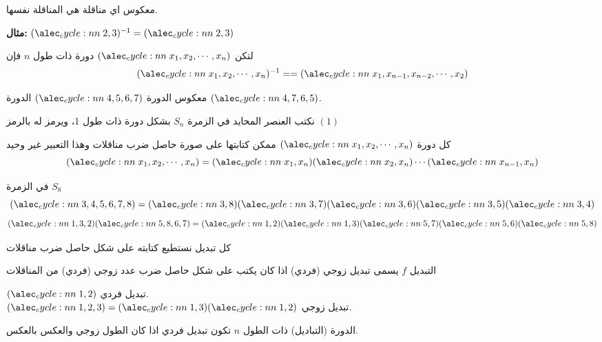 \begin{note}
معكوس اي مناقلة هي المناقلة نفسها.
\end{note}
\noindent
\textbf{مثال: }$\cycle{2,3}^{-1} = \cycle{2,3}$

\begin{note}
	لتكن $\cycle{x_1, x_2, \cdots, x_n}$ دورة ذات طول $n$ فإن
	\[
	\cycle{x_1, x_2, \cdots, x_n}^{-1} = = \cycle{x_1, x_{n-1}, x_{n-2}, \cdots, x_2}
	\]
\end{note}

\begin{example}
	معكوس الدورة $\cycle{4,5,6,7}$ الدورة $\cycle{4, 7,6,5}$.
\end{example}

\begin{note}
	نكتب العنصر المحايد في الزمرة $S_n$ بشكل دورة ذات طول 1، ويرمز له  بالرمز $(1)$
\end{note}

\begin{theorem}
	كل دورة $\cycle{x_1, x_2, \cdots, x_n}$ ممكن كتابتها على صورة حاصل ضرب مناقلات وهذا التعبير غير وحيد
	\[
	\cycle{x_1, x_2, \cdots, x_n} = \cycle{x_1, x_n}\cycle{x_2, x_n}\cdots\cycle{x_{n-1}, x_n}
	\]
\end{theorem}
\begin{example}
	في الزمرة $S_8$ 
	\[
	\cycle{3,4,5,6,7,8} = \cycle{3, 8} \cycle{3, 7} \cycle{3, 6} \cycle{3, 5} \cycle{3, 4}
	\]
	\[
	\cycle{1,3,2}\cycle{5,8,6,7} =  \cycle{1,2 } \cycle{1,3} \cycle{5,7 }  \cycle{5,6 }\cycle{5,8}
	\]
\end{example}

\begin{corollary}
	كل تبديل نستطيع كتابته على شكل حاصل ضرب مناقلات
\end{corollary}

\begin{definition}
	التبديل $f$ يسمى تبديل زوجي (فردي) اذا كان يكتب على شكل حاصل ضرب عدد زوجي (فردي) من المناقلات
\end{definition}

\begin{example}
	$\cycle{1,2}$ تبديل فردي.\\
	$\cycle{1,2,3} = \cycle{1,3}\cycle{1,2}$ تبديل زوجي.
\end{example}

\begin{note}
	الدورة (التباديل) ذات الطول $n$ تكون تبديل فردي اذا كان الطول زوجي والعكس بالعكس.
\end{note}

